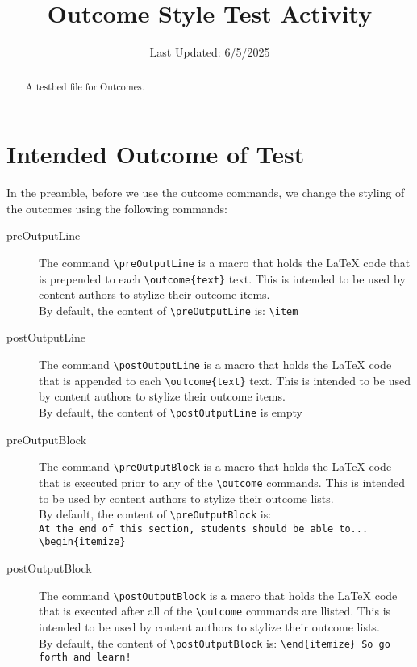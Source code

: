 \documentclass{ximera}
\title{Outcome Style Test Activity}
\date{Last Updated: 6/5/2025}
\renewcommand{\preOutputLine}{This marks the beginning of the outcome line. }
\renewcommand{\postOutputLine}{ This marks the end of Outcome Line.\\}
\renewcommand{\preOutputBlock}{This is the beginning of a boring block of outcomes. No itemize.\\}
\renewcommand{\postOutputBlock}{End of Block... a boring block without any itemize.\\}
\begin{document}
\begin{abstract}
    A testbed file for Outcomes.
\end{abstract}
\maketitle

\section{Intended Outcome of Test}

In the preamble, before we use the outcome commands, we change the styling of the outcomes using the following commands:
\begin{description}
    \item[preOutputLine] The command \verb|\preOutputLine| is a macro that holds the LaTeX code that is prepended to each \verb|\outcome{text}| text. 
            This is intended to be used by content authors to stylize their outcome items.\\
            By default, the content of \verb|\preOutputLine| is: \verb|\item |
    \item[postOutputLine] The command \verb|\postOutputLine| is a macro that holds the LaTeX code that is appended to each \verb|\outcome{text}| text. 
            This is intended to be used by content authors to stylize their outcome items.\\
            By default, the content of \verb|\postOutputLine| is empty
    \item[preOutputBlock] The command \verb|\preOutputBlock| is a macro that holds the LaTeX code that is executed prior to any of the \verb|\outcome| commands. 
            This is intended to be used by content authors to stylize their outcome lists.\\
            By default, the content of \verb|\preOutputBlock| is: \\
            \verb|At the end of this section, students should be able to... \begin{itemize}|
    \item[postOutputBlock] The command \verb|\postOutputBlock| is a macro that holds the LaTeX code that is executed after all of the \verb|\outcome| commands are llisted. 
            This is intended to be used by content authors to stylize their outcome lists.\\
            By default, the content of \verb|\postOutputBlock| is: \verb|\end{itemize} So go forth and learn!|

\end{description}
\end{document}
